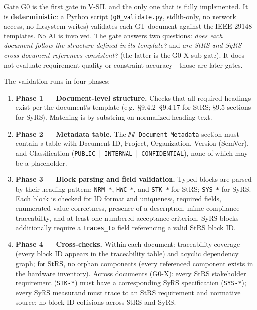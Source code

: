 \documentclass[11pt,a4paper]{article}
\begin{document}
Gate G0 is the first gate in V-SIL and the only one that is fully implemented. It is
\textbf{deterministic}: a Python script (\texttt{g0\_validate.py}, stdlib-only, no network
access, no filesystem writes) validates each GT document against the IEEE 29148 templates.
No AI is involved. The gate answers two questions: \emph{does each document follow the
structure defined in its template?} and \emph{are StRS and SyRS cross-document references
consistent?} (the latter is the G0-X sub-gate). It does not evaluate requirement quality or
constraint accuracy---those are later gates.

The validation runs in four phases:

\begin{enumerate}
  \item \textbf{Phase 1 --- Document-level structure.} Checks that all required headings
    exist per the document's template (e.g.\ \S9.4.2--\S9.4.17 for StRS;
    \S9.5 sections for SyRS). Matching is by substring on normalized heading text.
  \item \textbf{Phase 2 --- Metadata table.} The \texttt{\#\# Document Metadata} section
    must contain a table with Document ID, Project, Organization, Version (SemVer), and
    Classification (\texttt{PUBLIC}~|~\texttt{INTERNAL}~|~\texttt{CONFIDENTIAL}), none of
    which may be a placeholder.
  \item \textbf{Phase 3 --- Block parsing and field validation.} Typed blocks are parsed by
    their heading pattern: \texttt{NRM-*}, \texttt{HWC-*}, and \texttt{STK-*} for StRS;
    \texttt{SYS-*} for SyRS. Each block is checked for ID format and uniqueness, required
    fields, enumerated-value correctness, presence of a description, inline compliance
    traceability, and at least one numbered acceptance criterion. SyRS blocks additionally
    require a \texttt{traces\_to} field referencing a valid StRS block ID.
  \item \textbf{Phase 4 --- Cross-checks.} Within each document: traceability coverage
    (every block ID appears in the traceability table) and acyclic dependency graph; for
    StRS, no orphan components (every referenced component exists in the hardware inventory).
    Across documents (G0-X): every StRS stakeholder requirement (\texttt{STK-*}) must have a
    corresponding SyRS specification (\texttt{SYS-*}); every SyRS measurand must trace to an
    StRS requirement and normative source; no block-ID collisions across StRS and SyRS.
\end{enumerate}
\end{document}

